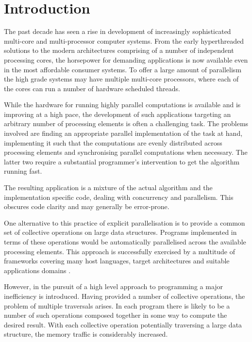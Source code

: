 \documentclass[preamble.tex]{subfiles}
\begin{document}
\pagebreak

\chapter{Introduction}
\label{ch:introduction}

The past decade has seen a rise in development of increasingly sophisticated multi-core and multi-processor computer systems. From the early hyperthreaded solutions to the modern architectures comprising of a number of independent processing cores, the horsepower for demanding applications is now available even in the most affordable consumer systems. To offer a large amount of parallelism the high grade systems may have multiple multi-core processors, where each of the cores can run a number of hardware scheduled threads.

While the hardware for running highly parallel computations is available and is improving at a high pace, the development of such applications targeting an arbitrary number of processing elements is often a challenging task. The problems involved are finding an appropriate parallel implementation of the task at hand, implementing it such that the computations are evenly distributed across processing elements and synchronising parallel computations when necessary. The latter two require a substantial programmer's intervention to get the algorithm running fast.


The resulting application is a mixture of the actual algorithm and the implementation specific code, dealing with concurrency and parallelism. This obscures code clarity and may generally be error-prone.

One alternative to this practice of explicit parallelisation is to provide a common set of collective operations\icollop{} on large data structures. Programs implemented in terms of these operations would be automatically parallelised across the available processing elements. This approach is successfully exercised by a multitude of frameworks covering many host languages, target architectures and suitable applications domains \cite{PLKC08,KCL+10,CKL+11,AS07}.

However, in the pursuit of a high level approach to programming a major inefficiency is introduced. Having provided a number of collective operations, the problem of multiple traversals arises. In each program there is likely to be a number of such operations composed together in some way to compute the desired result. With each collective operation potentially traversing a large data structure, the memory traffic is considerably increased.
\end{document}
